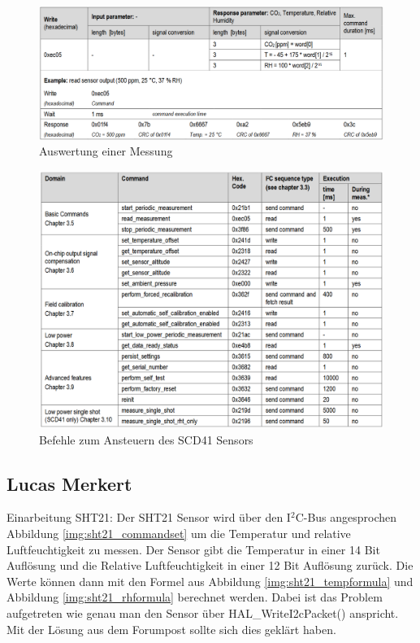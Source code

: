 \documentclass[]{article}
\begin{document}
\begin{figure}[!h]
	\centering
	\includegraphics[scale=0.40]{images/scd41_umrechnung}
	\caption{Auswertung einer Messung ~\cite{datasheetscd41}}
	\label{img:scd41_umrechnung}
\end{figure}
\begin{figure}[!h]
	\centering
	\includegraphics[scale=0.40]{images/scd41_commandset}
	\caption{Befehle zum Ansteuern des SCD41 Sensors~\cite{datasheetscd41}}
	\label{img:scd41_commandset}
\end{figure}

\subsection{Lucas Merkert}
\label{lucas}
Einarbeitung SHT21: Der SHT21 Sensor wird über den I$^2$C-Bus angesprochen {Abbildung \ref{img:sht21_commandset}} um die Temperatur und relative Luftfeuchtigkeit zu messen. Der Sensor gibt die Temperatur in einer 14 Bit Auflösung und die Relative Luftfeuchtigkeit in einer 12 Bit Auflösung zurück. Die Werte können dann mit den Formel aus {Abbildung \ref{img:sht21_tempformula}} und {Abbildung \ref{img:sht21_rhformula}} berechnet werden. Dabei ist das Problem aufgetreten wie genau man den Sensor über HAL\_WriteI2cPacket() anspricht. Mit der Lösung aus dem Forumpost sollte sich dies geklärt haben.
\end{document}
